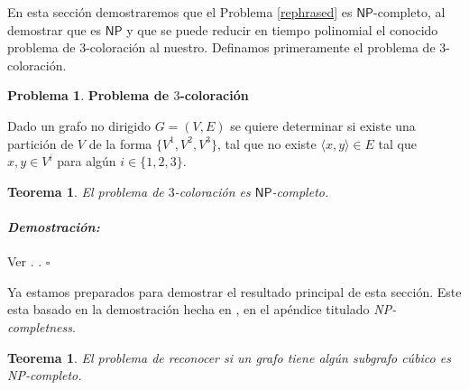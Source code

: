 \documentclass[10pt]{amsart}
\newtheorem{teo}[theorem]{Teorema}
\theoremstyle{definition}
\newtheorem{prob}[theorem]{Problema}
\numberwithin{equation}{section}
\newenvironment{myproof} {\paragraph{\emph{Demostraci\'on:}}}{\hfill$\square$}
\newcommand{\edge}[1]{\langle #1\rangle}
\begin{document}
En esta secci\'on demostraremos que el Problema \ref{rephrased} es $\mathsf{NP}$-completo, al demostrar que es $\mathsf{NP}$ y que se puede reducir en tiempo polinomial el conocido problema de $3$-coloraci\'on al nuestro. Definamos primeramente el problema de $3$-coloraci\'on.

	\begin{prob} \textbf{Problema de $3$-coloraci\'on}
		
		Dado un grafo no dirigido $G = (V,E)$ se quiere determinar si existe una partici\'on de $V$ de la forma $\{V^1, V^2, V^3\}$, tal que no existe $\edge{x,y} \in E$ tal que $x,y \in V^i$ para alg\'un $i \in \{1,2,3\}$.
		
	\end{prob}

\begin{teo}
	El problema de $3$-coloraci\'on es $\mathsf{NP}$-completo.
\end{teo}

\begin{myproof}
	Ver \cite{3-color}. .
\end{myproof}
	
	Ya estamos preparados para demostrar el resultado principal de esta secci\'on. Este esta basado en la demostraci\'on hecha en \cite{trsfrg}, en el ap\'endice titulado \emph{NP-completness}. 

\begin{teo}
	El problema de reconocer si un grafo tiene alg\'un subgrafo c\'ubico es NP-completo.
\end{teo}
\end{document}
